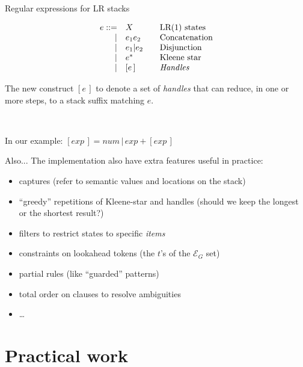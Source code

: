 \documentclass{beamer}          %
\begin{document}
\begin{frame}[t]{Regular expressions for LR stacks}

  $$
  \begin{array}{rlll}
    e ::=& X      & & \text{LR(1) states}\\
    | & e_1 e_2   & & \text{Concatenation}\\
    | & e_1 | e_2 & & \text{Disjunction}\\
    | & e^*       & & \text{Kleene star}\\
    | & [e\,]     & & \text{{\em Handles}}
  \end{array}
  $$

  \pause
  \vspace{1cm}
  The new construct $[e\,]$ to denote a set of {\em handles}
  that can reduce, in one or more steps, to a stack suffix matching $e$.

    \

  \pause
  In our example:
  $[exp\,] = num\,\big|\,exp + [exp\,]$
\end{frame}

\begin{frame}{Also...}
  The implementation also have extra features useful in practice:
  \begin{itemize}
    \item captures (refer to semantic values and locations on the stack)
    \item ``greedy'' repetitions of Kleene-star and handles (should we keep the longest or the shortest result?)
    \item filters to restrict states to specific {\em items}
    \item constraints on lookahead tokens (the $t$'s of the $\mathcal E_G$ set)
    \item partial rules (like ``guarded'' patterns)
    \item total order on clauses to resolve ambiguities
    \item \ldots
  \end{itemize}

\end{frame}

\section{Practical work}
\end{document}
